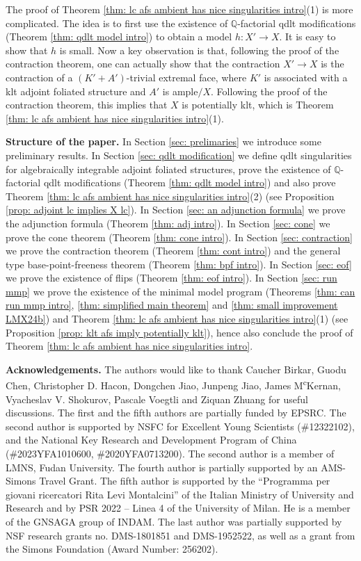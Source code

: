 \documentclass[12pt]{amsart}
\numberwithin{equation}{section}
\newcommand{\Qq}{\mathbb{Q}}
\theoremstyle{definition}
\theoremstyle{definition}
\theoremstyle{definition}
\begin{document}
The proof of Theorem \ref{thm: lc afs ambient has nice singularities intro}(1) is more complicated. The idea is to first use the existence of $\Qq$-factorial qdlt modifications (Theorem \ref{thm: qdlt model intro}) to obtain a model $h: X' \rightarrow X$. It is easy to show that $h$ is small. Now a key observation is that, following the proof of the contraction theorem, one can actually show that the contraction $X' \rightarrow X$ is the contraction of a $(K'+A')$-trivial extremal face, where $K'$ is associated with a klt adjoint foliated structure and $A'$ is ample$/X$. Following the proof of the contraction theorem, this implies that $X$ is potentially klt, which is Theorem \ref{thm: lc afs ambient has nice singularities intro}(1).


\medskip

\noindent\textbf{Structure of the paper.} In Section \ref{sec: prelimaries} we introduce some preliminary results. In Section \ref{sec: qdlt modification} we define qdlt singularities for algebraically integrable adjoint foliated structures, prove the existence of $\Qq$-factorial qdlt modifications (Theorem \ref{thm: qdlt model intro}) and also prove Theorem \ref{thm: lc afs ambient has nice singularities intro}(2) (see Proposition \ref{prop: adjoint lc implies X lc}).  In Section \ref{sec: an adjunction formula} we prove the adjunction formula (Theorem \ref{thm: adj intro}). In Section \ref{sec: cone} we prove the cone theorem (Theorem \ref{thm: cone intro}). In Section \ref{sec: contraction} we prove the contraction theorem (Theorem \ref{thm: cont intro}) and the general type base-point-freeness theorem (Theorem \ref{thm: bpf intro}). In Section \ref{sec: eof} we prove the existence of flips (Theorem \ref{thm: eof intro}).  In Section \ref{sec: run mmp} we prove the existence of the minimal model program (Theorems \ref{thm: can run mmp intro}, \ref{thm: simplified main theorem} and \ref{thm: small improvement LMX24b}) and Theorem \ref{thm: lc afs ambient has nice singularities intro}(1) (see Proposition \ref{prop: klt afs imply potentially klt}), hence also conclude the proof of Theorem \ref{thm: lc afs ambient has nice singularities intro}.


\medskip

\noindent\textbf{Acknowledgements.} The authors would like to thank Caucher Birkar, Guodu Chen, Christopher D. Hacon, Dongchen Jiao, Junpeng Jiao, James M\textsuperscript{c}Kernan, Vyacheslav V. Shokurov, 
Pascale Voegtli and Ziquan Zhuang for useful discussions. The first and the fifth authors are partially funded by EPSRC. The second author is supported by NSFC for Excellent Young Scientists (\#12322102), and the National Key Research and Development Program of China (\#2023YFA1010600, \#2020YFA0713200). The second author is a member of LMNS, Fudan University. 
The fourth author is partially supported by an AMS-Simons Travel Grant. 
The fifth author is supported by the 
``Programma per giovani ricercatori Rita Levi Montalcini''
of the Italian Ministry of University and Research
and by 
PSR 2022 -- Linea 4 of the 
University of Milan. 
He is a member of the GNSAGA group of INDAM.
The last author was partially supported by NSF research grants no. DMS-1801851 and DMS-1952522, as well as a grant from the Simons Foundation (Award Number: 256202).
\end{document}
